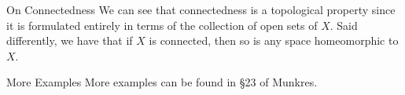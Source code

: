 \begin{remarkBox}{On Connectedness}
    We can see that connectedness is a topological property since it is 
    formulated entirely in terms of the collection of open sets of \( X \).
    Said differently, we have that if \( X \) is connected, then so is 
    any space homeomorphic to \( X \).
\end{remarkBox}

\begin{remarkBox}{More Examples}
    More examples can be found in \S 23 of Munkres.
\end{remarkBox}
